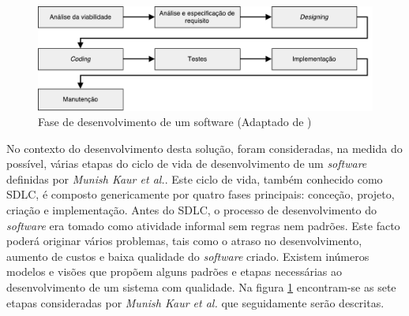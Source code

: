 \begin{figure}[!htb]
	\centering
	\includegraphics[scale=0.6]{esquemas/desenvolvimentoSW.pdf}
	\caption[Fase de desenvolvimento de um software ]{Fase de desenvolvimento de um software (Adaptado de \cite{Saini2014})}
	\label{sdlcartic}
\end{figure}


No contexto do desenvolvimento desta solução, foram consideradas, na medida do possível, várias etapas do ciclo de vida de desenvolvimento de um \textit{software} definidas por  \textit{Munish Kaur et al.}\cite{Saini2014}. Este ciclo de vida, também conhecido como \ac{SDLC}, é composto genericamente por quatro fases principais: conceção, projeto, criação e implementação. Antes do \ac{SDLC}, o processo de desenvolvimento do \textit{software} era tomado como atividade informal sem regras nem padrões. Este facto poderá originar vários problemas, tais como o atraso no desenvolvimento, aumento de custos e baixa qualidade do \textit{software} criado. Existem inúmeros modelos e visões que propõem alguns padrões e etapas necessárias ao desenvolvimento de um sistema com qualidade. Na figura \ref{sdlcartic} encontram-se as sete etapas consideradas por \textit{Munish Kaur et al.}\cite{Saini2014} que seguidamente serão descritas. 









